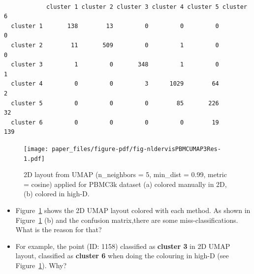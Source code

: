 \documentclass[
  12pt]{article}
\begin{document}
\begin{verbatim}
           
            cluster 1 cluster 2 cluster 3 cluster 4 cluster 5 cluster 6
  cluster 1       138        13         0         0         0         0
  cluster 2        11       509         0         1         0         0
  cluster 3         1         0       348         1         0         1
  cluster 4         0         0         3      1029        64         2
  cluster 5         0         0         0        85       226        32
  cluster 6         0         0         0         0        19       139
\end{verbatim}

\begin{figure}[H]

{\centering \texttt{[image: paper\_files/figure-pdf/fig-nldervisPBMCUMAP3Res-1.pdf]}

}

\caption{\label{fig-nldervisPBMCUMAP3Res}2D layout from UMAP
(n\_neighbors = 5, min\_dist = 0.99, metric = cosine) applied for PBMC3k
dataset (a) colored manually in 2D, (b) colored in high-D.}

\end{figure}

\begin{itemize}
\item
  Figure~\ref{fig-nldervisPBMCUMAP3Res} shows the 2D UMAP layout colored
  with each method. As shown in Figure~\ref{fig-nldervisPBMCUMAP3Res}
  (b) and the confusion matrix,there are some miss-classifications. What
  is the reason for that?
\item
  For example, the point (ID: 1158) classified as \textbf{cluster 3} in
  2D UMAP layout, classified as \textbf{cluster 6} when doing the
  colouring in high-D (see Figure~\ref{fig-nldervisPBMCUMAP3Res}). Why?
\end{itemize}
\end{document}
